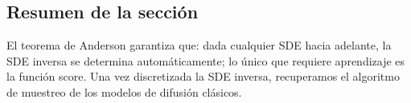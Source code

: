 \subsection{Resumen de la sección}

El teorema de Anderson garantiza que: dada cualquier SDE hacia adelante, la SDE inversa se determina automáticamente; lo único que requiere aprendizaje es la función score. Una vez discretizada la SDE inversa, recuperamos el algoritmo de muestreo de los modelos de difusión clásicos.

